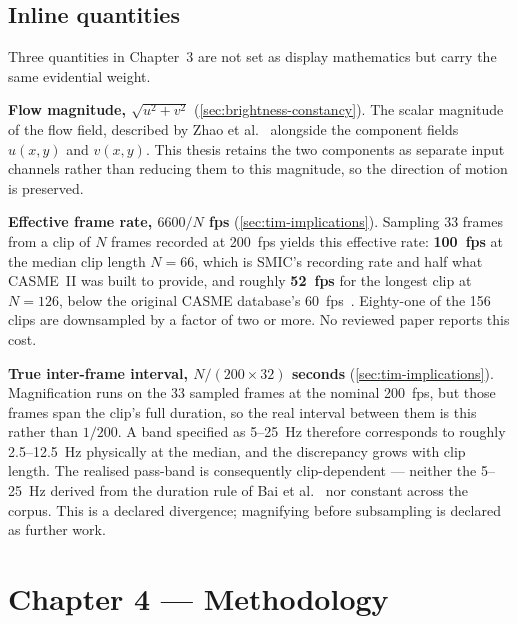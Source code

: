 \subsection{Inline quantities}
\label{eq:ch3-inline}

Three quantities in Chapter~3 are not set as display mathematics but carry the
same evidential weight.

\textbf{Flow magnitude, $\sqrt{u^2+v^2}$} (\autoref{sec:brightness-constancy}).
The scalar magnitude of the flow field, described by Zhao et
al.~\cite{zhaoS2021} alongside the component fields $u(x,y)$ and $v(x,y)$.
This thesis retains the two components as separate input channels rather than
reducing them to this magnitude, so the direction of motion is preserved.

\textbf{Effective frame rate, $6600/N$ fps} (\autoref{sec:tim-implications}).
Sampling 33 frames from a clip of $N$ frames recorded at 200~fps yields this
effective rate: \textbf{100~fps} at the median clip length $N=66$, which is
SMIC's recording rate and half what CASME~II was built to provide, and roughly
\textbf{52~fps} for the longest clip at $N=126$, below the original CASME
database's 60~fps~\cite{yan2014}. Eighty-one of the 156 clips are downsampled
by a factor of two or more. No reviewed paper reports this cost.

\textbf{True inter-frame interval, $N/(200 \times 32)$ seconds}
(\autoref{sec:tim-implications}). Magnification runs on the 33 sampled frames
at the nominal 200~fps, but those frames span the clip's full duration, so the
real interval between them is this rather than $1/200$. A band specified as
5--25~Hz therefore corresponds to roughly 2.5--12.5~Hz physically at the
median, and the discrepancy grows with clip length. The realised pass-band is
consequently clip-dependent --- neither the 5--25~Hz derived from the duration
rule of Bai et al.~\cite{bai2021} nor constant across the corpus. This is a
declared divergence; magnifying before subsampling is declared as further
work.


\section{Chapter 4 --- Methodology}
\label{sec:eq-ch4}

